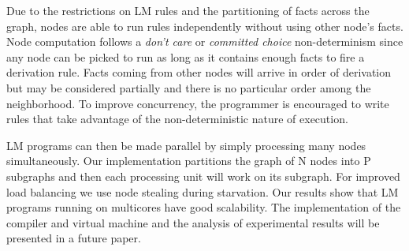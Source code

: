 Due to the restrictions on LM rules and the partitioning of facts across the graph, nodes are able to
run rules independently without using other node's facts. Node computation follows a \emph{don't care} or \emph{committed choice} non-determinism
since any node can be picked to run as long as it contains enough facts to fire a derivation rule.
Facts coming from other nodes will arrive in order of derivation but may be considered
partially and there is no particular order among the neighborhood. To improve concurrency,
the programmer is encouraged to write rules that take advantage of the non-deterministic nature of execution.

LM programs can then be made parallel by simply processing many nodes simultaneously.
Our implementation partitions the graph of N nodes into P subgraphs and then each processing unit will work on its subgraph.
For improved load balancing we use node stealing during starvation.
Our results show that LM programs running on multicores have good scalability.
The implementation of the compiler and virtual machine and
the analysis of experimental results will be presented in a future paper.